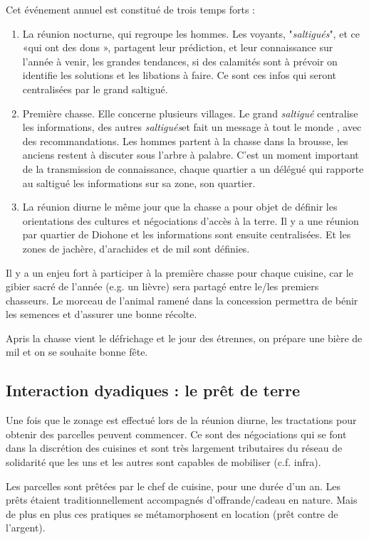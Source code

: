 Cet événement annuel est constitué de trois temps forts :
\begin{enumerate}
  \item La réunion nocturne, qui regroupe les hommes. Les voyants, "\textit{saltigués}", et ce «qui ont des dons », partagent leur prédiction, et leur connaissance sur l'année à venir, les grandes tendances, si des calamités sont à prévoir on identifie les solutions et les libations à faire. Ce sont ces infos qui seront centralisées par le grand saltigué.
  \item Première chasse. Elle concerne plusieurs villages.  Le grand \textit{saltigué} centralise les informations, des autres \textit{saltigués}et fait un message à tout le monde , avec des recommandations. Les hommes partent à la chasse dans la brousse, les anciens restent à discuter sous l'arbre à palabre. C'est un moment important de la transmission de connaissance, chaque quartier a un délégué qui rapporte au saltigué les informations sur sa zone, son quartier.
  \item La réunion diurne le même jour que la chasse a pour objet de définir les orientations des cultures et négociations d'accès à la terre. Il y a une réunion par quartier de Diohone et les informations sont ensuite centralisées. Et les zones de jachère, d'arachides et de mil sont définies.
\end{enumerate}

Il y a un enjeu fort à participer à la première chasse pour chaque cuisine, car le gibier sacré de l'année (e.g. un lièvre) sera partagé entre le/les premiers chasseurs. Le morceau de l'animal ramené dans la concession permettra de bénir les semences et d'assurer une bonne récolte.

Apris la chasse vient le défrichage  et  le jour des étrennes, on prépare une bière de mil et on se souhaite bonne fête.


\subsection{Interaction dyadiques : le prêt de terre}

Une fois que le zonage est effectué lors de la réunion diurne, les tractations pour obtenir des parcelles  peuvent commencer. Ce sont des négociations qui se font dans la discrétion des cuisines et sont très largement tributaires du réseau de solidarité que les uns et les autres sont capables de mobiliser (c.f. infra).

Les parcelles sont prêtées par le chef de cuisine, pour une durée d'un an. Les prêts étaient traditionnellement accompagnés d'offrande/cadeau en nature. Mais de plus en plus ces pratiques se métamorphosent en location (prêt contre de l'argent).

